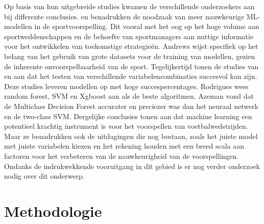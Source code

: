 Op basis van hun uitgebreide studies kwamen de verschillende onderzoekers aan bij differente conclusies.
\textcite{Bunker2019} en \textcite{KevinAndrews2021} benadrukken de noodzaak van meer nauwkeurige ML-modellen in de sportvoorspelling. Dit vooral met het oog op het hoge volume aan sportweddenschappen en de behoefte van sportmanagers aan nuttige informatie voor het ontwikkelen van toekomstige strategieën. Andrews wijst specifiek op het belang van het gebruik van grote datasets voor de training van modellen, gezien de inherente onvoorspelbaarheid van de sport.
Tegelijkertijd tonen de studies van \textcite{Rodrigues2022} en \textcite{Azeman2020} aan dat het testen van verschillende variabelencombinaties succesvol kan zijn. Deze studies leveren modellen op met hoge succespercentages. Rodrigues wees random forest, SVM en Xgboost aan als de beste algoritmen. Azeman vond dat de Multiclass Decision Forest accurater en preciezer was dan het neuraal netwerk en de two-class SVM.
Dergelijke conclusies tonen aan dat machine learning een potentieel krachtig instrument is voor het voorspellen van voetbalwedstrijden. Maar ze benadrukken ook de uitdagingen die nog bestaan, zoals het juiste model met juiste variabelen kiezen en het rekening houden met een breed scala aan factoren voor het verbeteren van de nauwkeurigheid van de voorspellingen. Ondanks de indrukwekkende vooruitgang in dit gebied is er nog verder onderzoek nodig over dit onderwerp.


\section{Methodologie}%
\label{sec:methodologie}

